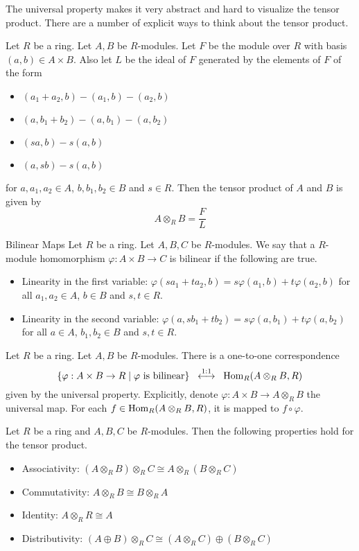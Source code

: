 \documentclass[a4paper]{article}
\begin{document}
The universal property makes it very abstract and hard to visualize the tensor product. There are a number of explicit ways to think about the tensor product. 

\begin{lmm}{}{} Let $R$ be a ring. Let $A,B$ be $R$-modules. Let $F$ be the module over $R$ with basis $(a,b)\in A\times B$. Also let $L$ be the ideal of $F$ generated by the elements of $F$ of the form 
\begin{itemize}
\item $(a_1+a_2,b)-(a_1,b)-(a_2,b)$
\item $(a,b_1+b_2)-(a,b_1)-(a,b_2)$
\item $(sa,b)-s(a,b)$
\item $(a,sb)-s(a,b)$
\end{itemize}
for $a,a_1,a_2\in A$, $b,b_1,b_2\in B$ and $s\in R$. Then the tensor product of $A$ and $B$ is given by $$A\otimes_RB=\frac{F}{L}$$
\end{lmm}

\begin{defn}{Bilinear Maps}{} Let $R$ be a ring. Let $A,B,C$ be $R$-modules. We say that a $R$-module homomorphism $\varphi:A\times B\to C$ is bilinear if the following are true. 
\begin{itemize}
\item Linearity in the first variable: $\varphi(sa_1+ta_2,b)=s\varphi(a_1,b)+t\varphi(a_2,b)$ for all $a_1,a_2\in A$, $b\in B$ and $s,t\in R$. 
\item Linearity in the second variable: $\varphi(a,sb_1+tb_2)=s\varphi(a,b_1)+t\varphi(a,b_2)$ for all $a\in A$, $b_1,b_2\in B$ and $s,t\in R$. 
\end{itemize}
\end{defn}

\begin{thm}{}{} Let $R$ be a ring. Let $A,B$ be $R$-modules. There is a one-to-one correspondence $$\left\{\varphi:A\times B\to R\;|\;\varphi\text{ is bilinear}\right\}\;\;\overset{1:1}{\longleftrightarrow}\;\;\operatorname{Hom}_R(A\otimes_RB,R)$$ given by the universal property. Explicitly, denote $\varphi:A\times B\to A\otimes_R B$ the universal map. For each $f\in\operatorname{Hom}_R(A\otimes_RB,R)$, it is mapped to $f\circ\varphi$. 
\end{thm}

\begin{prp}{}{} Let $R$ be a ring and $A,B,C$ be $R$-modules. Then the following properties hold for the tensor product. 
\begin{itemize}
\item Associativity: $(A\otimes_RB)\otimes_RC\cong A\otimes_R(B\otimes_RC)$
\item Commutativity: $A\otimes_R B\cong B\otimes_RA$
\item Identity: $A\otimes_RR\cong A$
\item Distributivity: $(A\oplus B)\otimes_R C\cong(A\otimes_RC)\oplus(B\otimes_RC)$
\end{itemize}
\end{prp}
\end{document}
